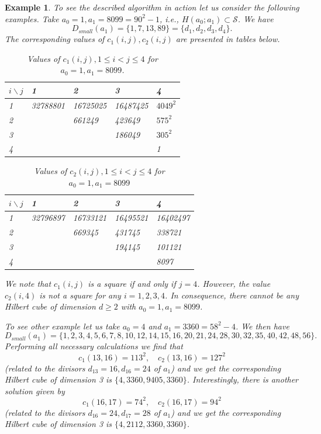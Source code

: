 \documentclass[10pt]{amsart}
\theoremstyle{plain}
\newtheorem{exam}[thm]{Example}
\def\cal{\mathcal}
\begin{document}
\begin{exam}
{\rm To see the described algorithm in action let us consider the following examples. 
Take $a_{0}=1, a_{1}=8099=90^2-1$, i.e., $H(a_{0}; a_{1})\subset \cal{S}$. We have 
$$
D_{small}(a_{1})=\{1, 7, 13, 89\}=\{d_{1}, d_{2}, d_{3}, d_{4}\}.
$$
The corresponding values of $c_{1}(i, j), c_{2}(i, j)$ are presented in tables below. 
\begin{table}[htbp]
\centering
\begin{tabular}{|l|llll|}
\hline
 $i\backslash j$ & 1       & 2        & 3        & 4\\
 \hline
   1           &32788801 & 16725025 & 16487425 & $4049^2$ \\
    2          &&661249 & 423649 & $575^2$  \\
     3         &&&186049 & $305^2$  \\
      4        &&&&1   \\
      \hline
\end{tabular}
\caption{Values of $c_{1}(i, j), 1\leq i<j\leq 4$ for $a_{0}=1, a_{1}=8099$.}
\end{table}

\begin{table}[htbp]
\centering
\begin{tabular}{|l|llll|}
\hline
 $i\backslash j$ & 1       & 2        & 3        & 4\\
 \hline
1 &32796897 & 16733121 & 16495521 & 16402497 \\
2 &&669345 & 431745 & 338721  \\
3 &&&194145 & 101121  \\
4 &&&&8097 \\
     \hline
\end{tabular}
\caption{Values of $c_{2}(i, j), 1\leq i<j\leq 4$ for $a_{0}=1, a_{1}=8099$}
\end{table}

We note that $c_{1}(i, j)$ is a square if and only if $j=4$. However, the value $c_{2}(i, 4)$ is not a square for any $i=1, 2, 3,4 $. In consequence, there cannot be any Hilbert cube of dimension $d\geq 2$ with $a_{0}=1, a_{1}=8099$.

To see other example let us take $a_{0}=4$ and $a_{1}=3360=58^2-4$. We then have
$$
D_{small}(a_{1})=\{1, 2, 3, 4, 5, 6, 7, 8, 10, 12, 14, 15, 16, 20, 21, 24, 28, 30, 32, 35, 40, 42, 48, 56\}.
$$
Performing all necessary calculations we find that 
$$
c_{1}(13,16)=113^2,\quad c_{2}(13,16)=127^2
$$ 
(related to the divisors $d_{13}=16, d_{16}=24$ of $a_{1}$) and we get the corresponding Hilbert cube of dimension 3 is $\{4,3360,9405,3360\}$. Interestingly, there is another solution given by 
$$
c_{1}(16,17)=74^2,\quad c_{2}(16,17)=94^2
$$ 
(related to the divisors $d_{16}=24, d_{17}=28$ of $a_{1}$) and we get the corresponding Hilbert cube of dimension 3 is $\{4, 2112, 3360,3360\}$.}
\end{exam}
\end{document}
